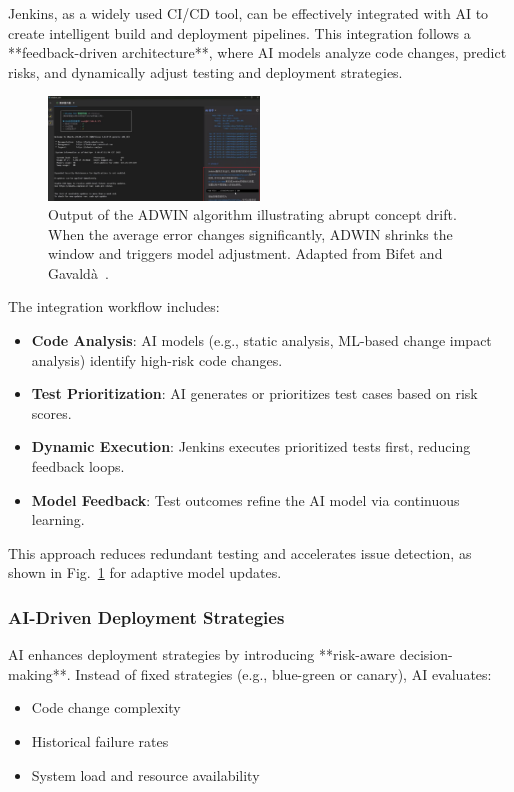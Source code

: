 \documentclass[manuscript,screen,review]{acmart}
\begin{document}
Jenkins, as a widely used CI/CD tool, can be effectively integrated with AI to create intelligent build and deployment pipelines. This integration follows a **feedback-driven architecture**, where AI models analyze code changes, predict risks, and dynamically adjust testing and deployment strategies.

\begin{figure}[H]
  \centering
  \includegraphics[width=0.5\textwidth]{picture/jenkins+ai+cursor.pdf}
  \caption{Output of the ADWIN algorithm illustrating abrupt concept drift. When the average error changes significantly, ADWIN shrinks the window and triggers model adjustment. Adapted from Bifet and Gavaldà~\cite{Bifet2007}.}
  \label{fig:adwin}
\end{figure}

The integration workflow includes:
\begin{itemize}
    \item \textbf{Code Analysis}: AI models (e.g., static analysis, ML-based change impact analysis) identify high-risk code changes.
    \item \textbf{Test Prioritization}: AI generates or prioritizes test cases based on risk scores.
    \item \textbf{Dynamic Execution}: Jenkins executes prioritized tests first, reducing feedback loops.
    \item \textbf{Model Feedback}: Test outcomes refine the AI model via continuous learning.
\end{itemize}

This approach reduces redundant testing and accelerates issue detection, as shown in Fig.~\ref{fig:adwin} for adaptive model updates.

\subsubsection{AI-Driven Deployment Strategies}

AI enhances deployment strategies by introducing **risk-aware decision-making**. Instead of fixed strategies (e.g., blue-green or canary), AI evaluates:
\begin{itemize}
    \item Code change complexity
    \item Historical failure rates
    \item System load and resource availability
\end{itemize}
\end{document}

